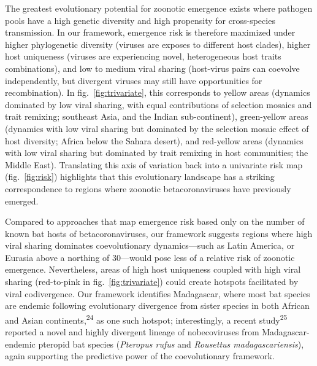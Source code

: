 \documentclass[11pt]{article}
\begin{document}
The greatest evolutionary potential for zoonotic emergence exists where
pathogen pools have a high genetic diversity and high propensity for
cross-species transmission. In our framework, emergence risk is
therefore maximized under higher phylogenetic diversity (viruses are
exposes to different host clades), higher host uniqueness (viruses are
experiencing novel, heterogeneous host traits combinations), and low to
medium viral sharing (host-virus pairs can coevolve independently, but
divergent viruses may still have opportunities for recombination). In
fig.~\ref{fig:trivariate}, this corresponds to yellow areas (dynamics
dominated by low viral sharing, with equal contributions of selection
mosaics and trait remixing; southeast Asia, and the Indian
sub-continent), green-yellow areas (dynamics with low viral sharing but
dominated by the selection mosaic effect of host diversity; Africa below
the Sahara desert), and red-yellow areas (dynamics with low viral
sharing but dominated by trait remixing in host communities; the Middle
East). Translating this axis of variation back into a univariate risk
map (fig.~\ref{fig:risk}) highlights that this evolutionary landscape
has a striking correspondence to regions where zoonotic
betacoronaviruses have previously emerged.

Compared to approaches that map emergence risk based only on the number
of known bat hosts of betacoronaviruses, our framework suggests regions
where high viral sharing dominates coevolutionary dynamics---such as
Latin America, or Eurasia above a northing of 30---would pose less of a
relative risk of zoonotic emergence. Nevertheless, areas of high host
uniqueness coupled with high viral sharing (red-to-pink in
fig.~\ref{fig:trivariate}) could create hotspots facilitated by viral
codivergence. Our framework identifies Madagascar, where most bat
species are endemic following evolutionary divergence from sister
species in both African and Asian continents,\textsuperscript{24} as one
such hotspot; interestingly, a recent study\textsuperscript{25} reported
a novel and highly divergent lineage of nobecoviruses from
Madagascar-endemic pteropid bat species (\emph{Pteropus rufus} and
\emph{Rousettus madagascariensis}), again supporting the predictive
power of the coevolutionary framework.
\end{document}
